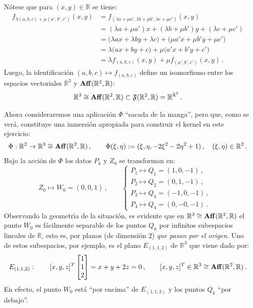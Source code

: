 \documentclass[12pt,reqno]{amsart}
\begin{document}
\smallskip\noindent
N\'otese que para $(x,y)\in\mathbb{R}$ se tiene:
\begin{align*}
f_{\lambda(a,b,c)+\mu(a',b',c')}(x,y)
&= f_{(\lambda a + \mu a',\lambda b + \mu b',\lambda c + \mu c')}(x,y) \\
&= (\lambda a + \mu a')x + (\lambda b + \mu b')y + (\lambda c + \mu c') \\
&= \big( \lambda a x + \lambda b y + \lambda c \big) +
   \big( \mu a' x + \mu b' y + \mu c' \big) \\
&= \lambda \big( a x + b y + c \big) + \mu \big( a' x + b' y + c' \big) \\
&= \lambda f_{(a,b,c)}(x,y) + \mu f_{(a',b',c')}(x,y)\,.
\end{align*}
Luego, la identificaci\'on $(a,b,c)\mapsto f_{(a,b,c)}$ define un
isomorfismo entre los espacios vectoriales $\mathbb{R}^3$ y
${\rm\bf Aff}(\mathbb{R}^2,\mathbb{R})$:
$$
\mathbb{R}^3 \cong {\rm\bf Aff}(\mathbb{R}^2,\mathbb{R})
\subset \mathfrak{F}(\mathbb{R}^2,\mathbb{R})
= \mathbb{R}^{\mathbb{R}^2}\,.
$$

\smallskip\noindent
Ahora consideraremos una aplicaci\'on $\Phi$ ``sacada de la manga'',
pero que, como se ver\'a, constituye una inmersi\'on apropiada
para construir el kernel en este ejercicio:
$$
\Phi:\mathbb{R}^2\to\mathbb{R}^3 \cong 
{\rm\bf Aff}(\mathbb{R}^2,\mathbb{R})\,,\qquad
\Phi(\xi,\eta):= (\xi,\eta, -2\xi^2-2\eta^2+1)\,,\quad 
(\xi,\eta)\in\mathbb{R}^2\,.
$$
Bajo la acci\'on de $\Phi$ los datos $P_k$ y $Z_0$ se transforman en:
\begin{equation*}
Z_0\mapsto W_0 = (0,0,1)\,,\qquad
\begin{cases}
P_1\mapsto Q_1 = (1,0,-1)\,, & \\
P_2\mapsto Q_2 = (0,1,-1)\,, & \\
P_3\mapsto Q_3 = (-1,0,-1)\,, & \\
P_4\mapsto Q_4 = (0,-0,-1)\,. &
\end{cases}
\end{equation*}
Observando la geometr\'\i a de la situaci\'on, es evidente que
en $\mathbb{R}^3 \cong {\rm\bf Aff}(\mathbb{R}^2,\mathbb{R})$
el punto $W_0$ es f\'acilmente separable de los puntos $Q_k$
por infinitos subespacios lineales de $\mathbb{R}$, esto es,
por planos (de dimensi\'on 2) {\em que pasan por el origen\/}.
Uno de estos subespacios, por ejemplo, es el plano $E_{(1,1,2)}$
de $\mathbb{R}^3$ que viene dado por:
$$
E_{(1,1,2)}:\qquad
[x,y,z]^T \begin{bmatrix} 1 \\ 1 \\ 2 \end{bmatrix}
= x+y+2z = 0\,,\qquad 
[x,y,z]^T\in\mathbb{R}^3 \cong {\rm\bf Aff}(\mathbb{R}^2,\mathbb{R})\,.
$$
En efecto, el punto $W_0$ est\'a ``por encima'' de $E_{(1,1,2)}$
y los puntos $Q_k$ ``por debajo''.
\end{document}

